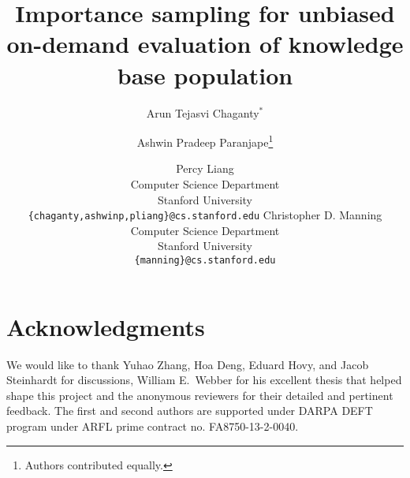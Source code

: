 \documentclass[11pt,letterpaper]{article}
\title{Importance sampling for unbiased on-demand evaluation of knowledge base population}
\author{%
  Arun Tejasvi Chaganty$^*$
\and%
Ashwin Pradeep Paranjape\thanks{\quad Authors contributed equally.} %
\and%
  Percy Liang
  \\
  Computer Science Department \\
  Stanford University \\
  {\tt \{chaganty,ashwinp,pliang\}@cs.stanford.edu}
\AND%
  Christopher D. Manning \\
  Computer Science Department \\
  Stanford University \\
  {\tt \{manning\}@cs.stanford.edu}
}
\date{}
\begin{document}
\maketitle

\begin{abstract}

\end{abstract}










\section*{Acknowledgments}
We would like to thank Yuhao Zhang, Hoa Deng, Eduard Hovy, and Jacob Steinhardt for discussions, William E.\ Webber for his excellent thesis that helped shape this project and the anonymous reviewers for their detailed and pertinent feedback.
The first and second authors are supported under DARPA DEFT program under ARFL prime contract no. FA8750-13-2-0040.




\appendix


\end{document}

